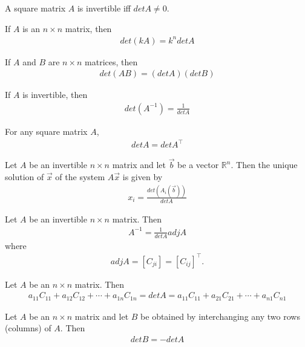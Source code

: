 \documentclass{article}
\begin{document}
\begin{theorem}
    A square matrix $A$ is invertible iff $det A \not= 0$.
\end{theorem}
\begin{theorem}
    If $A$ is an $n\times n$ matrix, then
    \begin{align*}
        det(kA) = k^n det A
    \end{align*}
\end{theorem}
\begin{theorem}
    If $A$ and $B$ are $n\times n$ matrices, then
    \begin{align*}
        det(AB) = (det A)(det B)
    \end{align*}
\end{theorem}
\begin{theorem}
    If $A$ is invertible, then
    \begin{align*}
        det(A^{-1})=\frac{1}{det A}
    \end{align*}
\end{theorem}
\begin{theorem}
    For any square matrix $A$,
    \begin{align*}
        det A = det A^\intercal
    \end{align*}
\end{theorem}
\begin{theorem}
    Let $A$ be an invertible $n\times n$ matrix and let $\vec b$ be a vector $\mathbb{R}^n$. Then the unique solution of $\vec x$ of the system $A\vec x$ is given by
    \begin{align*}
        x_i = \frac{det(A_i(\vec b))}{det A}
    \end{align*}
\end{theorem}
\begin{theorem}
    Let $A$ be an invertible $n\times n$ matrix. Then
    \begin{align*}
        A^{-1}=\frac{1}{det A}adj A
    \end{align*}
    where
    \begin{align*}
        adj A = [C_{ji}] = [C_{ij}]^\intercal.
    \end{align*}
\end{theorem}
\begin{theorem}
    Let $A$ be an $n\times n$ matrix. Then
    \begin{align*}
        a_{11}C_{11}+a_{12}C_{12}+\cdots+a_{1n}C_{1n}= det A = a_{11}C_{11}+a_{21}C_{21} + \cdots + a_{n1}C_{n1}
    \end{align*}
\end{theorem}
\begin{theorem}
    Let $A$ be an $n\times n$ matrix and let $B$ be obtained by interchanging any two rows (columns) of $A$. Then
    \begin{align*}
        det B = - det A
    \end{align*}
\end{theorem}
\end{document}
